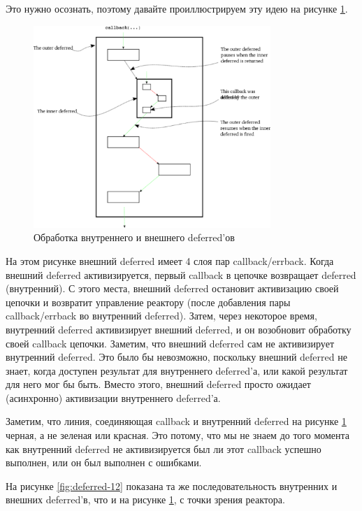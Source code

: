 Это нужно осознать, поэтому давайте проиллюстрируем эту идею 
на рисунке \ref{fig:deferred-11}.

\begin{figure}[h]
\begin{center}
    \includegraphics[width=0.8\textwidth]{images/deferred-11.pdf}
    \caption{Обработка внутреннего и внешнего deferred'ов\label{fig:deferred-11}}
\end{center}
\end{figure}

На этом рисунке внешний deferred имеет 4 слоя пар callback/errback. 
Когда внешний deferred активизируется, первый callback в цепочке 
возвращает deferred (внутренний). С этого места, внешний deferred 
остановит активизацию своей цепочки и возвратит управление реактору 
(после добавления пары callback/errback во внутренний deferred). 
Затем, через некоторое время, внутренний deferred активизирует 
внешний deferred, и он возобновит обработку своей callback цепочки. 
Заметим, что внешний deferred сам не активизирует внутренний deferred. 
Это было бы невозможно, поскольку внешний deferred не знает, когда 
доступен результат для внутреннего deferred'а, или какой результат для него  
мог бы быть. Вместо этого, внешний deferred просто ожидает (асинхронно) 
активизации внутреннего deferred'а.


Заметим, что линия, соединяющая callback и 
внутренний deferred на рисунке \ref{fig:deferred-11} 
черная, а не зеленая или красная.  Это потому, что мы 
не знаем до того момента как внутренний deferred не активизируется
был ли этот callback успешно выполнен, или он был выполнен 
с ошибками.  


На рисунке \ref{fig:deferred-12} показана та же последовательность 
внутренних и внешних deferred'в, что и на рисунке \ref{fig:deferred-11}, 
с точки зрения реактора.

